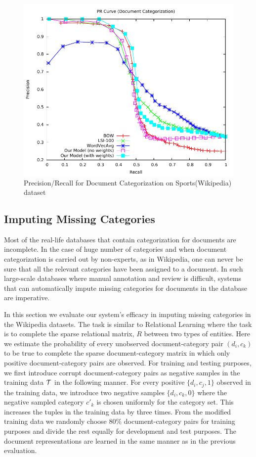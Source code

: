 \begin{figure}[tb]
\centering
        \includegraphics[width=0.8\columnwidth]{figs/pr/sports-cs-scala.pdf}
        \vskip -4mm
    \caption{\footnotesize Precision/Recall for Document Categorization on Sports(Wikipedia) dataset}
    \label{fig:pr:sports:cs} 
\end{figure}

\subsection{Imputing Missing Categories}
\label{sec:results:imputing}
Most of the real-life databases that contain categorization for documents are incomplete. In the case of huge number of categories and when document categorization is carried out by non-experts, as in Wikipedia, one can never be sure that all the relevant categories have been assigned to a document. In such large-scale databases where manual annotation and review is difficult, systems that can automatically impute missing categories for documents in the database are imperative.

In this section we evaluate our system's efficacy in imputing missing categories in the Wikipedia datasets.  
The task is similar to Relational Learning where the task is to complete the sparse relational matrix, $R$ between two types of entities. 
Here we estimate the probability of every unobserved document-category pair $(d_{i}, c_{k})$ to be true to complete the sparse document-category matrix in which only positive document-category pairs are observed.
For training and testing purposes, we first introduce corrupt document-category pairs as negative samples in the training data $\mathcal{T}$ in the following manner. For every positive $\{ d_{i}, c_{j}, 1\}$ observed in the training data, we introduce two negative samples $\{ d_{i}, c_{k}, 0\}$ where the negative sampled category $c'_{k}$ is chosen uniformly for the category set. This increases the tuples in the training data by three times. From the modified training data we randomly choose $80\%$ document-category pairs for training purposes and divide the rest equally for development and test purposes. The document representations are learned in the same manner as in the previous evaluation.

